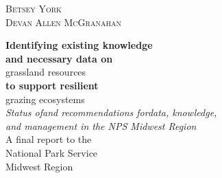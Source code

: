 	\raggedleft %
	
	\vspace*{\baselineskip} %
	
	
	\textsc{{\Large Betsey York \\
			Devan Allen McGranahan}} %
	
	\vspace*{0.167\textheight} %
	
	
	\textbf{\LARGE  Identifying existing knowledge\\
					and necessary data on }\\[\baselineskip] %
	
	{\textcolor{BisonGreen}{\Huge grassland resources}}\\[\baselineskip] %
	
		\textbf{\LARGE to support resilient }\\[\baselineskip]
	
	{\textcolor{BisonGreen}{\Huge grazing ecosystems }}\\[\baselineskip] %
		\textit{\LARGE Status of\textemdash and
			recommendations for\textemdash data, knowledge, \\
			and management in the NPS Midwest Region }\\[\baselineskip] %
	
	{\Large     A final report to the \\
					National Park Service \\
					Midwest Region} %
	
	\vfill %
	
	
	{\plogo }%
	
	\vspace*{3\baselineskip} %